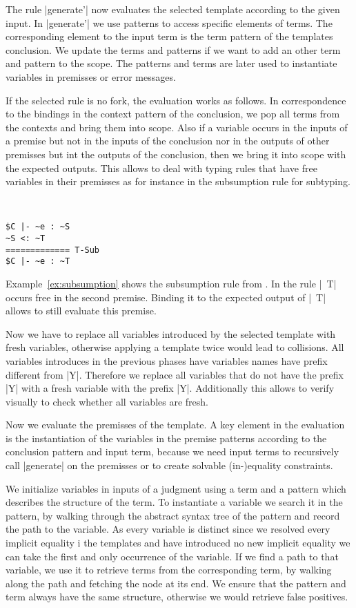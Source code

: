 The rule \code|generate'| now evaluates the selected template
according to the given input. In \code|generate'| we use patterns to
access specific elements of terms. The corresponding element to the
input term is the term pattern of the templates conclusion. We update
the terms and patterns if we want to add an other term and pattern to
the scope. The patterns and terms are later used to instantiate
variables in premisses or error messages.

If the selected rule is no fork, the evaluation works as follows. In
correspondence to the bindings in the context pattern of the
conclusion, we pop all terms from the contexts and bring them into
scope. Also if a variable occurs in the inputs of a premise but not in
the inputs of the conclusion nor in the outputs of other premisses but
int the outputs of the conclusion, then we bring it into scope with
the expected outputs. This allows to deal with typing rules that have
free variables in their premisses as for instance in the subsumption
rule for subtyping.

\begin{example}{~}
\begin{lstlisting}[language=sltc]
$C |- ~e : ~S
~S <: ~T
============= T-Sub
$C |- ~e : ~T
\end{lstlisting}
\label{ex:subsumption}
\end{example}

Example~\ref{ex:subsumption} shows the subsumption rule from
. In the rule \code|~T| occurs free in the second
premise. Binding it to the expected output of \code|~T| allows to
still evaluate this premise.

Now we have to replace all variables introduced by the selected
template with fresh variables, otherwise applying a template twice
would lead to collisions. All variables introduces in the previous
phases have variables names have prefix different from
\code|Y|. Therefore we replace all variables that do not have the
prefix \code|Y| with a fresh variable with the prefix
\code|Y|. Additionally this allows to verify visually to check whether
all variables are fresh.

Now we evaluate the premisses of the template. A key element in the
evaluation is the instantiation of the variables in the premise
patterns according to the conclusion pattern and input term, because
we need input terms to recursively call \code|generate| on the
premisses or to create solvable (in-)equality constraints.

We initialize variables in inputs of a judgment using a term and a
pattern which describes the structure of the term. To instantiate a
variable we search it in the pattern, by walking through the abstract
syntax tree of the pattern and record the path to the variable. As
every variable is distinct since we resolved every implicit equality i
the templates and have introduced no new implicit equality we can take
the first and only occurrence of the variable. If we find a path to
that variable, we use it to retrieve terms from the corresponding
term, by walking along the path and fetching the node at its end. We
ensure that the pattern and term always have the same structure,
otherwise we would retrieve false positives.

